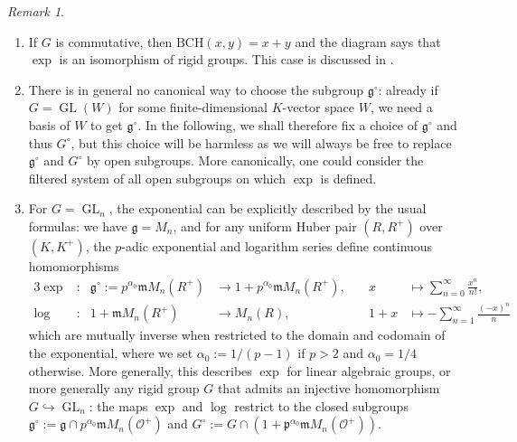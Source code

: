 \documentclass[11pt]{amsart}
\numberwithin{equation}{section}
\theoremstyle{definition}
\theoremstyle{remark}
\newtheorem{Remark}[thm]{Remark}
\newcommand{\lra}{\longrightarrow}
\renewcommand{\O}{\mathcal{O}}
\newcommand{\m}{\mathfrak{m}}
\newcommand{\mg}{\mathfrak{g}}
\newcommand{\GL}{\operatorname{GL}}
\begin{document}
\begin{Remark}\label{ex:exp}\leavevmode
	\begin{enumerate}
		\item 
		If $G$ is commutative, then $\mathrm{BCH}(x,y)=x+y$ and the diagram says that $\exp$ is an isomorphism of rigid groups. This case is discussed in \cite[Section~1.5]{Fargues-groupes-analytiques}.
	      \item There is in general no canonical way to choose the subgroup $\mathfrak g^\circ$: already if $G=\GL(W)$ for some finite-dimensional $K$-vector space $W$, we need a basis of $W$ to get $\mathfrak g^\circ$. In the following, we shall therefore fix a choice of $\mathfrak g^\circ$ and thus $G^\circ$, but this choice will be harmless as we will always be free to replace $\mathfrak g^\circ$ and $G^\circ$ by open subgroups. More canonically, one could consider the filtered  system of all open subgroups on which $\exp$ is defined.
		\item For $G=\GL_n$, the exponential can be explicitly described by the usual formulas: we have $\mg=M_n$, and for any uniform Huber pair  $(R,R^+)$ over $(K,K^+)$, the $p$-adic exponential and logarithm series define continuous homomorphisms
		\begin{alignat*}{3}
			\exp&\colon&\mg^\circ:=p^{\alpha_0}\m M_n(R^+)&\lra 1+p^{\alpha_0}\m M_n(R^+),\quad & x&\longmapsto \textstyle\sum_{n=0}^\infty \frac{x^n}{n!},\\
			\log&\colon&1+\mathfrak mM_n(R^+)&\lra M_n(R),\quad & 1+x&\longmapsto -\textstyle\sum_{n=1}^\infty \frac{(-x)^n}{n}
		\end{alignat*}
		which are mutually inverse when restricted to the domain and codomain of the exponential, where we set $\alpha_0:=1/(p-1)$ if $p>2$ and $\alpha_0=1/4$ otherwise. More generally, this describes $\exp$ for linear algebraic groups, or more generally any rigid group $G$ that admits an injective homomorphism $G\hookrightarrow \GL_n$: the maps $\exp$ and $\log$ restrict to the closed subgroups $\mg^\circ:=\mg\cap p^{\alpha_0}\m M_n(\O^+)$ and $G^\circ:=G\cap (1+\mathfrak p^{\alpha_0}\m M_n(\O^+))$.
	\end{enumerate}
\end{Remark}
\end{document}
